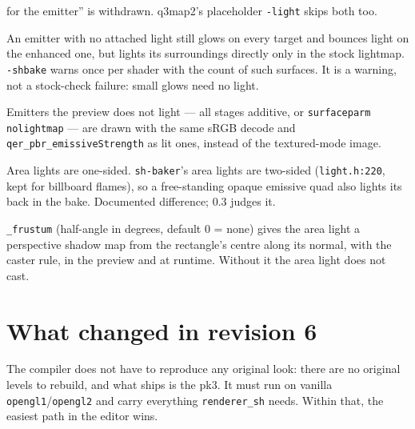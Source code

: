 \documentclass[11pt,a4paper]{article}
\begin{document}
\begin{description}[style=nextline]
  for the emitter'' is withdrawn. q3map2's placeholder \texttt{-light} skips both too.
\item[Unattached emitters warn.] An emitter with no attached light still glows on every target and
  bounces light on the enhanced one, but lights its surroundings directly only in the stock
  lightmap. \texttt{-shbake} warns once per shader with the count of such surfaces. It is a warning,
  not a stock-check failure: small glows need no light.
\item[The preview draws every emitter in linear HDR.] Emitters the preview does not light --- all
  stages additive, or \texttt{surfaceparm nolightmap} --- are drawn with the same sRGB decode and
  \texttt{qer\_pbr\_emissiveStrength} as lit ones, instead of the textured-mode image.
\item[Sidedness.] Area lights are one-sided. \texttt{sh-baker}'s area lights are two-sided
  (\texttt{light.h:220}, kept for billboard flames), so a free-standing opaque emissive quad also
  lights its back in the bake. Documented difference; 0.3 judges it.
\item[Shadows by frustum.] \texttt{\_frustum} (half-angle in degrees, default 0 = none) gives the
  area light a perspective shadow map from the rectangle's centre along its normal, with the caster
  rule, in the preview and at runtime. Without it the area light does not cast.
\end{description}

\section{What changed in revision 6}\label{sec:rev6}

The compiler does not have to reproduce any original look: there are no original levels to
rebuild, and what ships is the pk3. It must run on vanilla \texttt{opengl1}/\texttt{opengl2} and
carry everything \texttt{renderer\_sh} needs. Within that, the easiest path in the editor wins.
\end{document}
